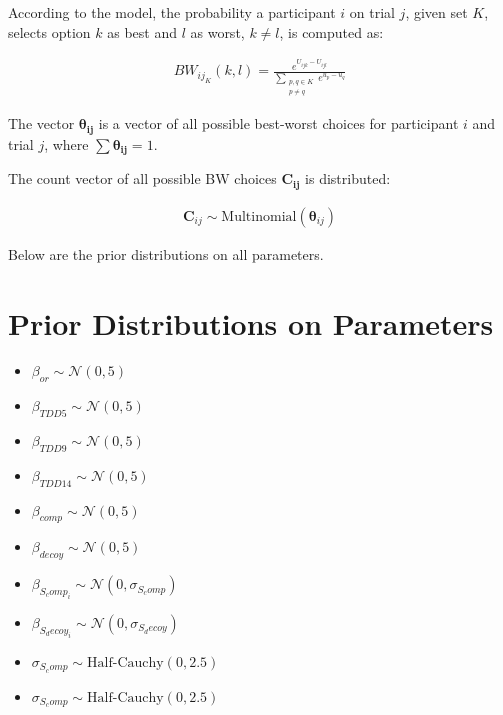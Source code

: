 According to the model, the probability a participant $i$ on trial $j$, given set $K$, selects option $k$ as best and $l$ as worst, $k \neq l$, is computed as:

\begin{align}
    BW_{ij_{K}}(k,l)=\frac{e^{U_{ijk}-U_{ijl}}}{\sum_{\substack{{p,q}\in K\\p \neq q}} e^{u_{p}-u_{q}}}
\end{align}

The vector $\boldsymbol{\theta_{ij}}$ is a vector of all possible best-worst choices for participant $i$ and trial $j$, where $\sum \boldsymbol{\theta_{ij}} = 1$.

The count vector of all possible BW choices $\boldsymbol{C_{ij}}$ is distributed:

\begin{align}
    \boldsymbol{C}_{ij} \sim \text{Multinomial}(\boldsymbol{\theta}_{ij})
\end{align}


Below are the prior distributions on all parameters.

\section{Prior Distributions on Parameters}
\begin{itemize}
    \item $\beta_{or} \sim \mathcal{N}(0, 5)$
    \item $\beta_{TDD5} \sim \mathcal{N}(0, 5)$
    \item $\beta_{TDD9} \sim \mathcal{N}(0, 5)$
    \item $\beta_{TDD14} \sim \mathcal{N}(0, 5)$
    \item $\beta_{comp} \sim \mathcal{N}(0, 5)$
    \item $\beta_{decoy} \sim \mathcal{N}(0, 5)$
    \item $\beta_{S_comp_i} \sim \mathcal{N}(0, \sigma_{S_comp})$
    \item $\beta_{S_decoy_i} \sim \mathcal{N}(0, \sigma_{S_decoy})$
    \item $\sigma_{S_comp} \sim \text{Half-Cauchy}(0, 2.5)$
    \item $\sigma_{S_comp} \sim \text{Half-Cauchy}(0, 2.5)$
\end{itemize}

